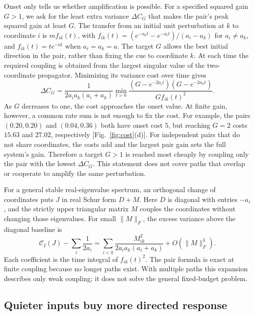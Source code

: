 \documentclass[aps,10pt,onecolumn,superscriptaddress,nofootinbib,longbibliography,
  amsmath,amssymb,floatfix]{revtex4-2}
\newcommand{\Cnoise}{\mathcal C}
\begin{document}
Onset only tells us whether amplification is possible. For a
specified squared gain \(G>1\), we ask for the least extra variance
\(\Delta C_G\) that makes the pair's peak squared gain at least \(G\).
The transfer from an initial unit perturbation at \(k\) to coordinate
\(i\) is \(m f_{ik}(t)\), with
\(f_{ik}(t)=(e^{-a_k t}-e^{-a_i t})/(a_i-a_k)\) for \(a_i\ne a_k\),
and \(f_{ik}(t)=te^{-at}\) when \(a_i=a_k=a\).
The target \(G\) allows the best initial direction in the pair,
rather than fixing the cue to coordinate \(k\).
At each time the required coupling is obtained from the largest
singular value of the two-coordinate propagator. Minimizing its
variance cost over time gives
\begin{equation}
 \Delta C_G=\frac{1}{2a_i a_k(a_i+a_k)}
  \min_{t>0}\frac{(G-e^{-2a_i t})(G-e^{-2a_k t})}{G f_{ik}(t)^2}.
 \label{eq:targetcost}
\end{equation}
As \(G\) decreases to one, the cost approaches the onset value.
At finite gain, however, a common rate sum is not enough to fix
the cost. For example, the pairs \((0.20,0.20)\) and \((0.04,0.36)\)
both have onset cost \(5\), but reaching \(G=2\) costs \(15.63\)
and \(27.02\), respectively [Fig.~\ref{fig:cost}(d)].
For independent pairs that do not share coordinates, the costs add
and the largest pair gain sets the full system's gain. Therefore a
target \(G>1\) is reached most cheaply by coupling only the pair
with the lowest \(\Delta C_G\). This statement does not cover paths
that overlap or cooperate to amplify the same perturbation.

For a general stable real-eigenvalue spectrum, an orthogonal
change of coordinates puts \(J\) in real Schur form \(D+M\).
Here \(D\) is diagonal with entries \(-a_i\), and the strictly upper
triangular matrix \(M\) couples the coordinates without changing
those eigenvalues. For small \(\|M\|_F\), the excess variance above
the diagonal baseline is
\begin{equation}
  \Cnoise_I(J)-\sum_i \frac{1}{2a_i}
    =\sum_{i<k}\frac{M_{ik}^2}{2a_i a_k(a_i+a_k)}
      +O(\|M\|_F^3).
  \label{eq:weighted}
\end{equation}
Each coefficient is the time integral of \(f_{ik}(t)^2\).
The pair formula is exact at finite coupling because no longer
paths exist. With multiple paths this expansion describes only
weak coupling; it does not solve the general fixed-budget problem.

\subsection{Quieter inputs buy more directed response}
\end{document}
